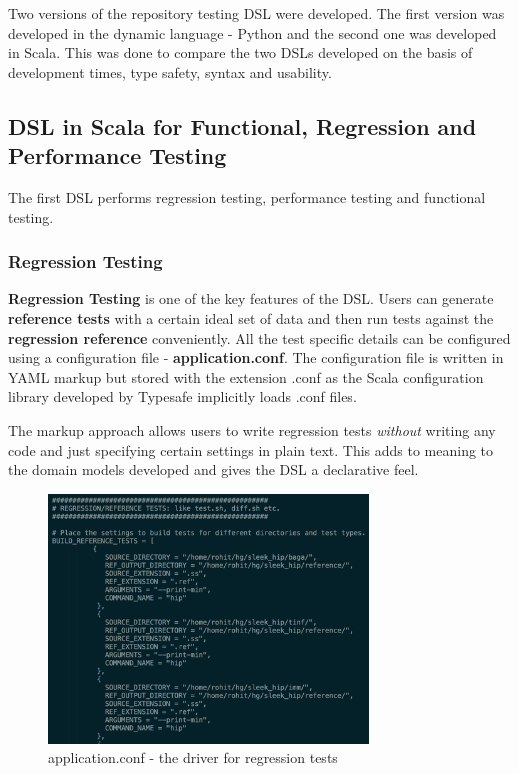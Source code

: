 \noindent
Two versions of the repository testing DSL were developed. The first version was developed in the dynamic language - Python and the second one was developed in Scala. This was done to compare the two DSLs developed on the basis of development times, type safety, syntax and usability.

\subsection{DSL in Scala for Functional, Regression and Performance Testing}
The first DSL performs regression testing, performance testing and functional testing.

\subsubsection{Regression Testing}
\textbf{Regression Testing} is one of the key features of the DSL. Users can generate \textbf{reference tests} with a certain ideal set of data and then run tests against the \textbf{regression reference} conveniently. All the test specific details can be configured using a configuration file - \textbf{application.conf}. The configuration file is written in YAML markup but stored with the extension .conf as the Scala configuration library developed by Typesafe implicitly loads .conf files.
\bigskip

\noindent
The markup approach allows users to write regression tests \textit{without} writing any code and just specifying certain settings in plain text. This adds to meaning to the domain models developed and gives the DSL a declarative feel.

\bigskip
\begin{figure}[H]
  \centering
    \includegraphics[height=250px]{figures/application_conf.png}
  \caption{application.conf - the driver for regression tests}
\end{figure}

